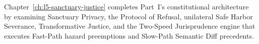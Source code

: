 Chapter~\ref{ch:l5-sanctuary-justice} completes Part~I's constitutional architecture by examining
Sanctuary Privacy, the Protocol of Refusal, unilateral Safe Harbor Severance, Transformative
Justice, and the Two-Speed Jurisprudence engine that executes Fast-Path hazard preemptions and
Slow-Path Semantic Diff precedents.
